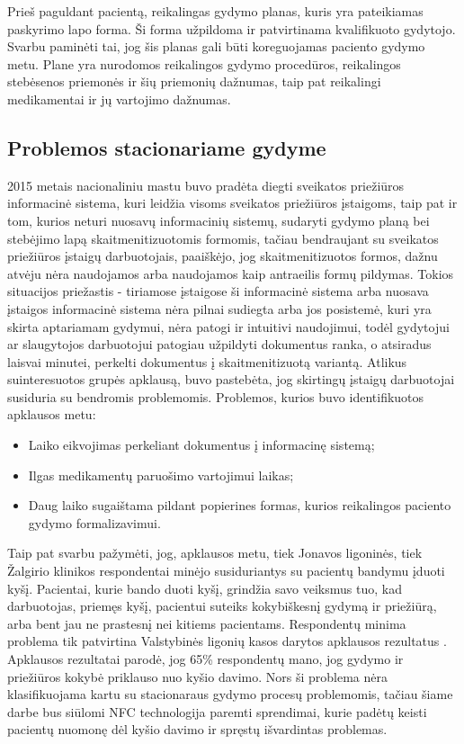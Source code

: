 Prieš paguldant pacientą, reikalingas gydymo planas, kuris yra pateikiamas paskyrimo lapo forma. Ši forma užpildoma ir patvirtinama kvalifikuoto gydytojo. Svarbu paminėti tai, jog šis planas gali būti koreguojamas paciento gydymo metu. Plane yra nurodomos reikalingos gydymo procedūros, reikalingos stebėsenos priemonės ir šių priemonių dažnumas, taip pat reikalingi medikamentai ir jų vartojimo dažnumas. 
\subsection{Problemos stacionariame gydyme}
2015 metais nacionaliniu mastu buvo pradėta diegti sveikatos priežiūros informacinė sistema, kuri leidžia visoms sveikatos priežiūros įstaigoms, taip pat ir tom, kurios neturi nuosavų informacinių sistemų, sudaryti gydymo planą bei stebėjimo lapą skaitmenitizuotomis formomis, tačiau bendraujant su sveikatos priežiūros įstaigų darbuotojais, paaiškėjo, jog skaitmenitizuotos formos, dažnu atvėju nėra naudojamos arba naudojamos kaip antraeilis formų pildymas. Tokios situacijos priežastis - tiriamose įstaigose ši informacinė sistema arba nuosava įstaigos informacinė sistema nėra pilnai sudiegta arba jos posistemė, kuri yra skirta aptariamam gydymui, nėra patogi ir intuitivi naudojimui, todėl gydytojui ar slaugytojos darbuotojui patogiau užpildyti dokumentus ranka, o atsiradus laisvai minutei, perkelti dokumentus į skaitmenitizuotą variantą. Atlikus suinteresuotos grupės apklausą, buvo pastebėta, jog skirtingų įstaigų darbuotojai susiduria su bendromis problemomis. Problemos, kurios buvo identifikuotos apklausos metu: 
\begin{itemize}
    \item Laiko eikvojimas perkeliant dokumentus į informacinę sistemą;
    \item Ilgas medikamentų paruošimo vartojimui laikas;
    \item Daug laiko sugaištama pildant popierines formas, kurios reikalingos paciento gydymo formalizavimui.
\end{itemize}

Taip pat svarbu pažymėti, jog, apklausos metu, tiek Jonavos ligoninės, tiek Žalgirio klinikos respondentai minėjo susiduriantys su pacientų bandymu įduoti kyšį. Pacientai, kurie bando duoti kyšį, grindžia savo veiksmus tuo, kad darbuotojas, priemęs kyšį, pacientui suteiks kokybiškesnį gydymą ir priežiūrą, arba bent jau ne prastesnį nei kitiems pacientams. Respondentų minima problema tik patvirtina Valstybinės ligonių kasos darytos apklausos rezultatus \cite{Kasa2016}. Apklausos rezultatai parodė, jog 65\% respondentų mano, jog gydymo ir priežiūros kokybė priklauso nuo kyšio davimo. Nors ši problema nėra klasifikuojama kartu su stacionaraus gydymo procesų problemomis, tačiau šiame darbe bus siūlomi NFC technologija paremti sprendimai, kurie padėtų keisti pacientų nuomonę dėl kyšio davimo ir spręstų išvardintas problemas.







